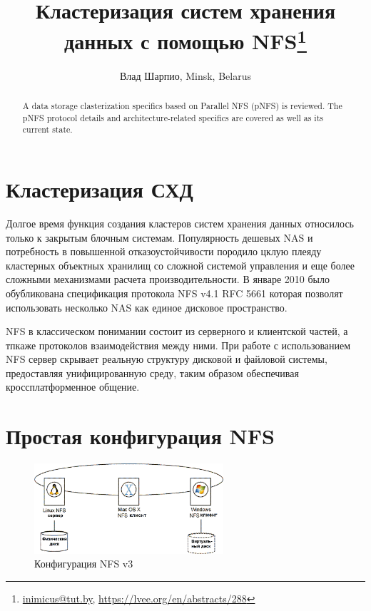 \documentclass[10pt, a5paper]{article}
\begin{document}
\title{Кластеризация систем хранения данных с помощью NFS\footnote{\url{inimicus@tut.by}, \url{https://lvee.org/en/abstracts/288}}}
\author{Влад Шарпио, Minsk, Belarus}
\maketitle
\begin{abstract}
A data storage clasterization specifics based on Parallel NFS (pNFS) is reviewed. The pNFS protocol details and architecture-related specifics are covered as well as its current state.
\end{abstract}
\section*{Кластеризация СХД}

Долгое время функция создания кластеров систем хранения данных относилось только к закрытым блочным системам. Популярность дешевых NAS  и потребность в повышенной отказоустойчивости породило цклую плеяду кластерных объектных хранилищ со сложной системой управления и еще более сложными механизмами расчета производительности. В январе  2010 было обубликована спецификация протокола NFS v4.1 RFC 5661 которая позволят использовать несколько NAS  как единое дисковое пространство.

NFS в классическом понимании состоит из серверного и клиентской частей, а тпкаже протоколов взаимодействия между ними. При работе с использованием NFS сервер скрывает реальную  структуру дисковой и файловой системы, предоставляя унифицированную среду, таким образом обеспечивая кроссплатформенное общение.

\section*{Простая конфигурация NFS}

\begin{center}
\begin{figure}[h!]
  \centering
  \includegraphics[width=7cm]{16_2018_Sharpio1}
  \caption{Конфигурация NFS v3}
  \label{Sharpio1}
\end{figure}
\end{center} 
\end{document}
